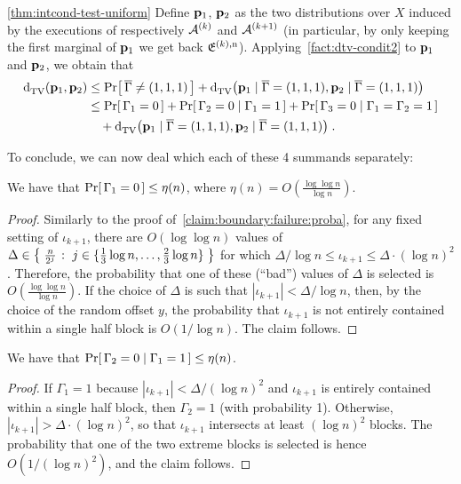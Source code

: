 \begin{proofof}{\cref{thm:intcond-test-uniform}}
Define $\mathbf{p}_1$, $\mathbf{p}_2$ as the two distributions over $X$ induced by the executions of respectively $\mathcal{A}^{(k)}$ and $\mathcal{A}^{(k+1)}$ (in particular, by only keeping the first marginal of $\mathbf{p}_1$ we get back $\mathfrak{E}^{(k),\rm n}$). Applying~\cref{fact:dtv-condit2} to  $\mathbf{p}_1$ and $\mathbf{p}_2$, we obtain that
\begin{align}\label{eq:everything:is:going:to:be:alright}
  {\operatorname{d}_{\textrm{TV}}^{}\!\left({ \ensuremath{\mathbf{p}}_1 ,  \ensuremath{\mathbf{p}}_2 }\right)}
  &\leq \Pr\!\left[\,  \overline{\Gamma} \neq (1,1,1) \, \right]
      + {\operatorname{d}_{\textrm{TV}}^{}\!\left({ \mathbf{p}_1 \;\vert\;  \overline{\Gamma} = (1,1,1) ,  \mathbf{p}_2 \;\vert\; \overline{\Gamma} = (1,1,1) }\right)} \notag\\
  &\leq \Pr\!\left[\,  \Gamma_1 = 0 \, \right] + \Pr\!\left[\,  \Gamma_2 = 0  \;\middle\vert\;  \Gamma_1 = 1 \, \right]  + \Pr\!\left[\,  \Gamma_3 = 0  \;\middle\vert\;  \Gamma_1 = \Gamma_2 = 1 \, \right]  \notag\\
    &\quad+ {\operatorname{d}_{\textrm{TV}}^{}\!\left({ \mathbf{p}_1 \;\vert\;  \overline{\Gamma} = (1,1,1) ,  \mathbf{p}_2 \;\vert\; \overline{\Gamma} = (1,1,1) }\right)}\;.
\end{align}

\noindent To conclude, we can now deal which each of these 4 summands separately:
\begin{claim}\label{claim:adapt:proba:gamma:1}
We have that $\Pr\!\left[\,  \Gamma_1 = 0 \, \right] \leq \eta(n)$, where
$\eta(n) = O\left({\frac {\log \log n}{\log n}}\right)$.
\end{claim}
\begin{proof}
Similarly to the proof of~\cref{claim:boundary:failure:proba},
for any fixed
setting of $\iota_{k+1}$, there are $O(\log \log n)$ values of
$\Delta \in \left\{\; {\frac{n}{2^j}}  \;\colon\;  j \in \{{\frac{1}3} \log n, \dots,
{\frac{2}3} \log n\} \; \right\}$ for which
\mbox{$\Delta/\log n \leq \iota_{k+1} \leq \Delta \cdot (\log n)^2$.}
Therefore, the probability that one of these (``bad'') values of $\Delta$ is selected is
$O\left({\frac {\log \log n}{\log n}}\right)$. If the choice of $\Delta$ is such that
 $|\iota_{k+1}| < \Delta/\log n$, then, by the choice of the random offset $y$,
 the probability that $\iota_{k+1}$ is not entirely contained within a single
 half block is $O(1/\log n)$. The claim follows.
\end{proof}

\begin{claim}\label{claim:adapt:proba:gamma:2}
We have that $\Pr\!\left[\,  \Gamma_2 = 0  \;\middle\vert\;  \Gamma_1 = 1 \, \right] \leq \eta(n)$.
\end{claim}
\begin{proof}
If $\Gamma_1=1$ because $|\iota_{k+1}| < \Delta/(\log n)^2$ and
$\iota_{k+1}$ is  entirely contained within a single
 half block, then $\Gamma_2 = 1$ (with probability 1).
Otherwise, $|\iota_{k+1}| > \Delta \cdot (\log n)^2$, so that
$\iota_{k+1}$ intersects at least $(\log n)^2$ blocks. The probability
that one of the two extreme blocks is selected is hence
$O(1/(\log n)^2)$, and the claim follows.
\end{proof}


\end{proofof}
